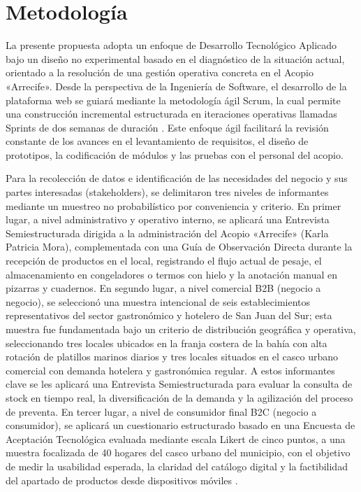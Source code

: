 
\section{Metodología}

La presente propuesta adopta un enfoque de Desarrollo Tecnológico Aplicado bajo un diseño no experimental basado en el diagnóstico de la situación actual, orientado a la resolución de una gestión operativa concreta en el Acopio «Arrecife». Desde la perspectiva de la Ingeniería de Software, el desarrollo de la plataforma web se guiará mediante la metodología ágil Scrum, la cual permite una construcción incremental estructurada en iteraciones operativas llamadas Sprints de dos semanas de duración \parencite{pressman2021}. Este enfoque ágil facilitará la revisión constante de los avances en el levantamiento de requisitos, el diseño de prototipos, la codificación de módulos y las pruebas con el personal del acopio.

Para la recolección de datos e identificación de las necesidades del negocio y sus partes interesadas (stakeholders), se delimitaron tres niveles de informantes mediante un muestreo no probabilístico por conveniencia y criterio. En primer lugar, a nivel administrativo y operativo interno, se aplicará una Entrevista Semiestructurada dirigida a la administración del Acopio «Arrecife» (Karla Patricia Mora), complementada con una Guía de Observación Directa durante la recepción de productos en el local, registrando el flujo actual de pesaje, el almacenamiento en congeladores o termos con hielo y la anotación manual en pizarras y cuadernos. En segundo lugar, a nivel comercial B2B (negocio a negocio), se seleccionó una muestra intencional de seis establecimientos representativos del sector gastronómico y hotelero de San Juan del Sur; esta muestra fue fundamentada bajo un criterio de distribución geográfica y operativa, seleccionando tres locales ubicados en la franja costera de la bahía con alta rotación de platillos marinos diarios y tres locales situados en el casco urbano comercial con demanda hotelera y gastronómica regular. A estos informantes clave se les aplicará una Entrevista Semiestructurada para evaluar la consulta de stock en tiempo real, la diversificación de la demanda y la agilización del proceso de preventa. En tercer lugar, a nivel de consumidor final B2C (negocio a consumidor), se aplicará un cuestionario estructurado basado en una Encuesta de Aceptación Tecnológica evaluada mediante escala Likert de cinco puntos, a una muestra focalizada de 40 hogares del casco urbano del municipio, con el objetivo de medir la usabilidad esperada, la claridad del catálogo digital y la factibilidad del apartado de productos desde dispositivos móviles \parencite{davis1989,maldonado2021}.


